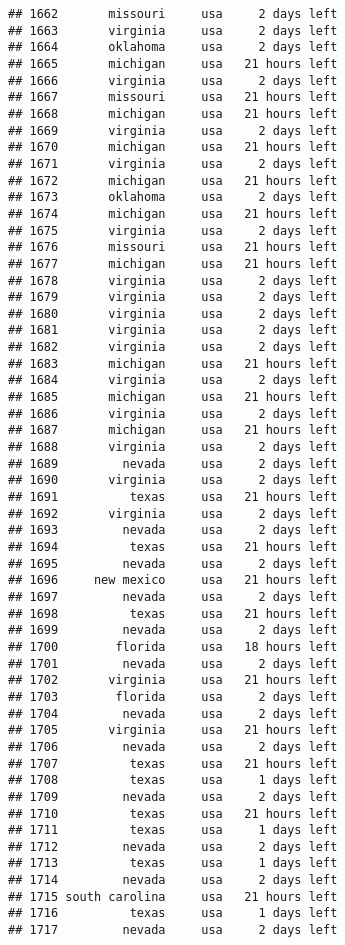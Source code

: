 \documentclass[
]{article}
\begin{document}
\begin{verbatim}
## 1662       missouri     usa     2 days left
## 1663       virginia     usa     2 days left
## 1664       oklahoma     usa     2 days left
## 1665       michigan     usa   21 hours left
## 1666       virginia     usa     2 days left
## 1667       missouri     usa   21 hours left
## 1668       michigan     usa   21 hours left
## 1669       virginia     usa     2 days left
## 1670       michigan     usa   21 hours left
## 1671       virginia     usa     2 days left
## 1672       michigan     usa   21 hours left
## 1673       oklahoma     usa     2 days left
## 1674       michigan     usa   21 hours left
## 1675       virginia     usa     2 days left
## 1676       missouri     usa   21 hours left
## 1677       michigan     usa   21 hours left
## 1678       virginia     usa     2 days left
## 1679       virginia     usa     2 days left
## 1680       virginia     usa     2 days left
## 1681       virginia     usa     2 days left
## 1682       virginia     usa     2 days left
## 1683       michigan     usa   21 hours left
## 1684       virginia     usa     2 days left
## 1685       michigan     usa   21 hours left
## 1686       virginia     usa     2 days left
## 1687       michigan     usa   21 hours left
## 1688       virginia     usa     2 days left
## 1689         nevada     usa     2 days left
## 1690       virginia     usa     2 days left
## 1691          texas     usa   21 hours left
## 1692       virginia     usa     2 days left
## 1693         nevada     usa     2 days left
## 1694          texas     usa   21 hours left
## 1695         nevada     usa     2 days left
## 1696     new mexico     usa   21 hours left
## 1697         nevada     usa     2 days left
## 1698          texas     usa   21 hours left
## 1699         nevada     usa     2 days left
## 1700        florida     usa   18 hours left
## 1701         nevada     usa     2 days left
## 1702       virginia     usa   21 hours left
## 1703        florida     usa     2 days left
## 1704         nevada     usa     2 days left
## 1705       virginia     usa   21 hours left
## 1706         nevada     usa     2 days left
## 1707          texas     usa   21 hours left
## 1708          texas     usa     1 days left
## 1709         nevada     usa     2 days left
## 1710          texas     usa   21 hours left
## 1711          texas     usa     1 days left
## 1712         nevada     usa     2 days left
## 1713          texas     usa     1 days left
## 1714         nevada     usa     2 days left
## 1715 south carolina     usa   21 hours left
## 1716          texas     usa     1 days left
## 1717         nevada     usa     2 days left

\end{verbatim}
\end{document}
